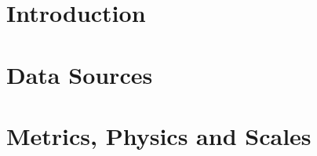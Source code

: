 \documentclass[preprint, times]{elsarticle}
\newcommand{\reviewed}[1]{{\bf Reviewed by: #1}}
\newcommand{\current}[1]{{\bf Currently working: #1}}
\newcommand{\willreview}[1]{{\bf Next: #1}}
\newcommand{\RM}{\fbox{\textsl{Ronaldo Menezes}}}
\newcommand{\GG}{\fbox{\textsl{Gourab Ghoshal}}}
\newcommand{\JR}{\fbox{\textsl{Jos\'e Ramasco}}}
\newcommand{\FS}{\fbox{\textsl{Filippo Simini}}}
\newcommand{\TL}{\fbox{\textsl{Thomas Louail}}}
\newcommand{\HB}{\fbox{\textsl{Hugo Barbosa}}}
\newcommand{\MT}{\fbox{\textsl{Marcello Tomasini}}}
\newcommand{\ML}{\fbox{\textsl{Maxime Lenormand}}}
\newcommand{\CJ}{\fbox{\textsl{Charlotte James}}}
\begin{document}


\tableofcontents

\section{Introduction}
\label{sec:intro}



\section{Data Sources}
\label{sec:data}



\section{Metrics, Physics and Scales}
\label{sec:scaling}
\end{document}
